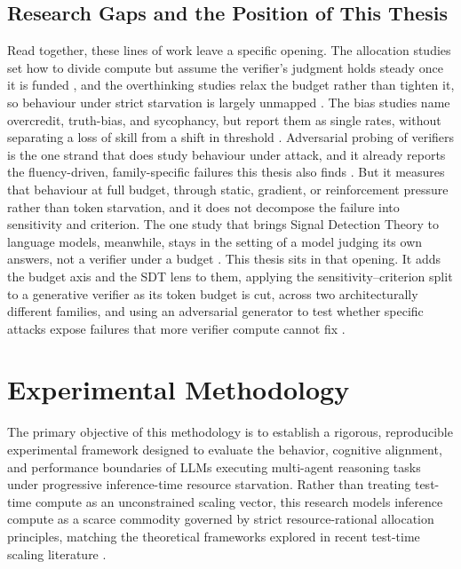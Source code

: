 \documentclass[12pt, a4paper, oneside]{report}
\begin{document}
\section{Research Gaps and the Position of This Thesis}
Read together, these lines of work leave a specific opening. The allocation studies set how to divide compute but assume the verifier's judgment holds steady once it is funded \parencite{Singhi2025, Wang2025}, and the overthinking studies relax the budget rather than tighten it, so behaviour under strict starvation is largely unmapped \parencite{Zhou2026, Almaghrabi2026}. The bias studies name overcredit, truth-bias, and sycophancy, but report them as single rates, without separating a loss of skill from a shift in threshold \parencite{Fanous2025}. Adversarial probing of verifiers is the one strand that does study behaviour under attack, and it already reports the fluency-driven, family-specific failures this thesis also finds \parencite{Juneja2025}. But it measures that behaviour at full budget, through static, gradient, or reinforcement pressure rather than token starvation, and it does not decompose the failure into sensitivity and criterion. The one study that brings Signal Detection Theory to language models, meanwhile, stays in the setting of a model judging its own answers, not a verifier under a budget \parencite{Cacioli2026}. This thesis sits in that opening. It adds the budget axis and the SDT lens to them, applying the sensitivity–criterion split to a generative verifier as its token budget is cut, across two architecturally different families, and using an adversarial generator to test whether specific attacks expose failures that more verifier compute cannot fix \parencite{Cacioli2026, Singhi2025}.





\chapter{Experimental Methodology}
The primary objective of this methodology is to establish a rigorous, reproducible experimental framework designed to evaluate the behavior, cognitive alignment, and performance boundaries of LLMs executing multi-agent reasoning tasks under progressive inference-time resource starvation. Rather than treating test-time compute as an unconstrained scaling vector, this research models inference compute as a scarce commodity governed by strict resource-rational allocation principles, matching the theoretical frameworks explored in recent test-time scaling literature \parencite{Zhang2025tts}.
\end{document}

